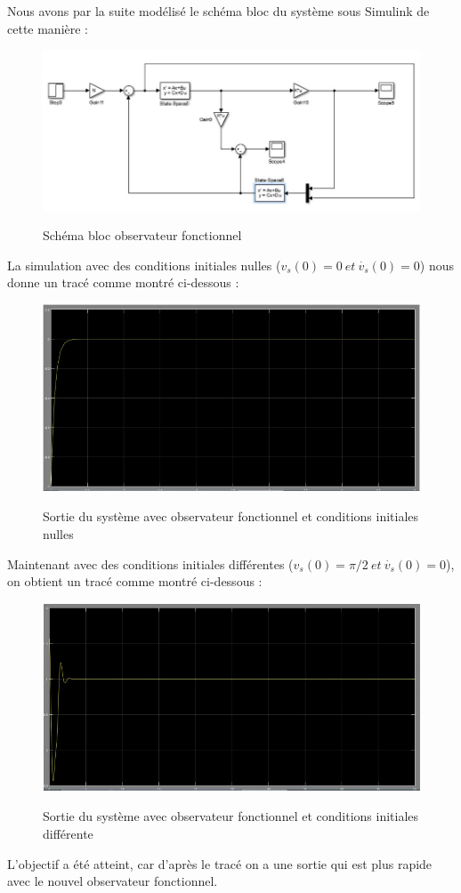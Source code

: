 \par Nous avons par la suite modélisé le schéma bloc du système sous Simulink de cette manière :
\begin{figure}[h!]
\centering
\includegraphics[scale = 0.5]{Capture.JPG}\\[0.7 cm] 
\caption{Schéma bloc observateur fonctionnel}
\end{figure}
\par La simulation avec des conditions initiales nulles ($v_s(0)=0~et~\dot{v_s}(0)=0$) nous donne un tracé comme montré ci-dessous :
\begin{figure}[h!]
\centering
\includegraphics[scale = 0.7]{S1.JPG}\\[0.7 cm] 
\caption{Sortie du système avec observateur fonctionnel et conditions initiales nulles}
\end{figure}
\pagebreak
\par Maintenant avec des conditions initiales différentes ($v_s(0)=\pi/2~et~\dot{v_s}(0)=0$), on obtient un tracé comme montré ci-dessous :
\begin{figure}[h!]
\centering
\includegraphics[scale = 0.7]{S2.JPG}\\[0.7 cm] 
\caption{Sortie du système avec observateur fonctionnel et conditions initiales différente}
\end{figure}
\par L'objectif a été atteint, car d'après le tracé on a une sortie qui est plus rapide avec le nouvel observateur fonctionnel.
